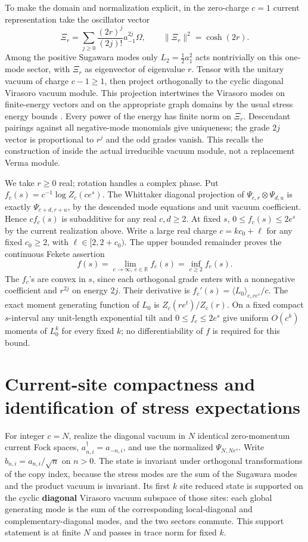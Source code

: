 \documentclass[11pt]{article}
\begin{document}
To make the domain and normalization explicit, in the zero-charge \(c=1\) current representation take the oscillator vector
\[
 \Xi_r=\sum_{j\ge0}\frac{(2r)^j}{(2j)!}a_{-1}^{2j}\Omega,\qquad
 \|\Xi_r\|^2=\cosh(2r).
\]
Among the positive Sugawara modes only \(L_2=\tfrac12a_1^2\) acts nontrivially on this one-mode sector, with \(\Xi_r\) as eigenvector of eigenvalue \(r\). Tensor with the unitary vacuum of charge \(c-1\ge1\), then project orthogonally to the cyclic diagonal Virasoro vacuum module. This projection intertwines the Virasoro modes on finite-energy vectors and on the appropriate graph domains by the usual stress energy bounds \cite{carpi,fewster}. Every power of the energy has finite norm on \(\Xi_r\). Descendant pairings against all negative-mode monomials give uniqueness; the grade \(2j\) vector is proportional to \(r^j\) and the odd grades vanish. This recalls the construction of \cite{p34} inside the actual irreducible vacuum module, not a replacement Verma module.

We take \(r\ge0\) real; rotation handles a complex phase. Put \(f_c(s)=c^{-1}\log Z_c(ce^s)\). The Whittaker diagonal projection of \(\Psi_{c,r}\otimes\Psi_{d,u}\) is exactly \(\Psi_{c+d,r+u}\), by the descended mode equations and unit vacuum coefficient. Hence \(c f_c(s)\) is subadditive for any real \(c,d\ge2\). At fixed \(s\), \(0\le f_c(s)\le2e^s\) by the current realization above. Write a large real charge \(c=k c_0+\ell\) for any fixed \(c_0\ge2\), with \(\ell\in[2,2+c_0)\). The upper bounded remainder proves the continuous Fekete assertion \[
 f(s)=\lim_{c\to\infty,\ c\in\mathbb R} f_c(s)=\inf_{c\ge2}f_c(s).
\] The \(f_c\)'s are convex in \(s\), since each orthogonal grade enters with a nonnegative coefficient and \(r^{2j}\) on energy \(2j\). Their derivative is \(f_c'(s)=\langle L_0\rangle_{c,ce^s}/c\). The exact moment generating function of \(L_0\) is \(Z_c(re^t)/Z_c(r)\). On a fixed compact \(s\)-interval any unit-length exponential tilt and \(0\le f_c\le2e^s\) give uniform \(O(c^k)\) moments of \(L_0^k\) for every fixed \(k\); no differentiability of \(f\) is required for this bound.

\section{Current-site compactness and identification of stress expectations}\label{current-site-compactness-and-identification-of-stress-expectations}

For integer \(c=N\), realize the diagonal vacuum in \(N\) identical zero-momentum current Fock spaces, \(a_{n,i}^\dagger=a_{-n,i}\), and use the normalized \(\Psi_{N,N e^s}\). Write \(b_{n,i}=a_{n,i}/\sqrt n\) on \(n>0\). The state is invariant under orthogonal transformations of the copy index, because the stress modes are the sum of the Sugawara modes and the product vacuum is invariant. Its first \(k\) site reduced state is supported on the cyclic \textbf{diagonal} Virasoro vacuum subspace of those sites: each global generating mode is the sum of the corresponding local-diagonal and complementary-diagonal modes, and the two sectors commute. This support statement is at finite \(N\) and passes in trace norm for fixed \(k\).
\end{document}
